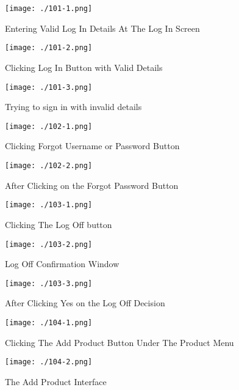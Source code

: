 \begin{figure}[H]
    \texttt{[image: ./101-1.png]}
    \caption{Entering Valid Log In Details At The Log In Screen} \label{fig:101-1}
\end{figure}

\begin{figure}[H]
    \texttt{[image: ./101-2.png]}
    \caption{Clicking Log In Button with Valid Details} \label{fig:101-2}
\end{figure}

\begin{figure}[H]
    \texttt{[image: ./101-3.png]}
    \caption{Trying to sign in with invalid details} \label{fig:101-3}
\end{figure}

\begin{figure}[H]
    \texttt{[image: ./102-1.png]}
    \caption{Clicking Forgot Username or Password Button} \label{fig:102-1}
\end{figure}

\begin{figure}[H]
    \texttt{[image: ./102-2.png]}
    \caption{After Clicking on the Forgot Password Button } \label{fig:102-2}
\end{figure}

\begin{figure}[H]
    \texttt{[image: ./103-1.png]}
    \caption{Clicking The Log Off button} \label{fig:103-1}
\end{figure}

\begin{figure}[H]
    \texttt{[image: ./103-2.png]}
    \caption{Log Off Confirmation Window} \label{fig:103-2}
\end{figure}

\begin{figure}[H]
    \texttt{[image: ./103-3.png]}
    \caption{After Clicking Yes on the Log Off Decision} \label{fig:103-3}
\end{figure}

\begin{figure}[H]
    \texttt{[image: ./104-1.png]}
    \caption{Clicking The Add Product Button Under The Product Menu} \label{fig:104-1}
\end{figure}

\begin{figure}[H]
    \texttt{[image: ./104-2.png]}
    \caption{The Add Product Interface} \label{fig:104-2}
\end{figure}

